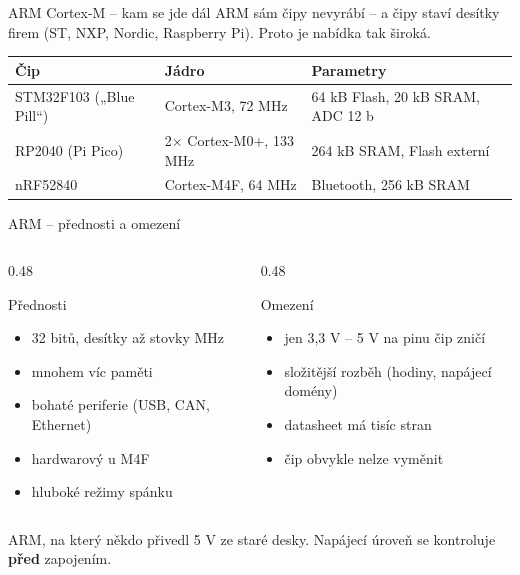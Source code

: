 \documentclass[12pt,aspectratio=169]{beamer}
\begin{document}
\begin{frame}{ARM Cortex-M -- kam se jde dál}
  \small
  ARM sám čipy nevyrábí --  a čipy staví desítky firem
  (ST, NXP, Nordic, Raspberry Pi). Proto je nabídka tak široká.

  \vspace{3mm}
  \footnotesize
  \begin{tabular}{@{}p{3.2cm}p{3.2cm}p{4.4cm}@{}}
    \toprule
    Čip & Jádro & Parametry \\
    \midrule
    STM32F103 („Blue Pill``) & Cortex-M3, 72 MHz & 64 kB Flash, 20 kB SRAM, ADC 12 b \\
    \addlinespace
    RP2040 (Pi Pico) & 2$\times$ Cortex-M0+, 133 MHz & 264 kB SRAM, Flash externí \\
    \addlinespace
    nRF52840 & Cortex-M4F, 64 MHz & Bluetooth, 256 kB SRAM \\
    \bottomrule
  \end{tabular}
\end{frame}

\begin{frame}{ARM -- přednosti a omezení}
  \begin{columns}[T]
    \begin{column}{0.48\textwidth}
      \begin{exampleblock}{Přednosti}
        \footnotesize
        \begin{itemize}
          \item 32 bitů, desítky až stovky MHz
          \item mnohem víc paměti
          \item bohaté periferie (USB, CAN, Ethernet)
          \item hardwarový  u M4F
          \item hluboké režimy spánku
        \end{itemize}
      \end{exampleblock}
    \end{column}
    \begin{column}{0.48\textwidth}
      \begin{alertblock}{Omezení}
        \footnotesize
        \begin{itemize}
          \item jen 3,3 V -- 5 V na pinu čip zničí
          \item složitější rozběh (hodiny, napájecí domény)
          \item datasheet má tisíc stran
          \item čip obvykle nelze vyměnit
        \end{itemize}
      \end{alertblock}
    \end{column}
  \end{columns}
  \vspace{1mm}
  \small
   ARM, na který někdo přivedl
  5 V ze staré desky. Napájecí úroveň se kontroluje \textbf{před} zapojením.
\end{frame}
\end{document}
